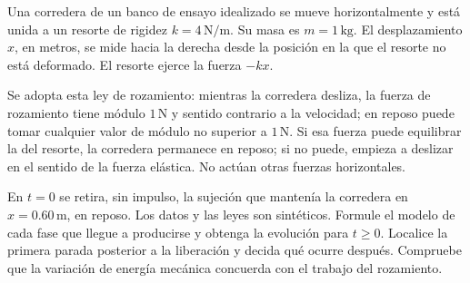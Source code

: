 Una corredera de un banco de ensayo idealizado se mueve horizontalmente y está unida a un resorte de rigidez \(k=4\,\mathrm{N/m}\). Su masa es \(m=1\,\mathrm{kg}\). El desplazamiento \(x\), en metros, se mide hacia la derecha desde la posición en la que el resorte no está deformado. El resorte ejerce la fuerza \(-kx\).

Se adopta esta ley de rozamiento: mientras la corredera desliza, la fuerza de rozamiento tiene módulo \(1\,\mathrm N\) y sentido contrario a la velocidad; en reposo puede tomar cualquier valor de módulo no superior a \(1\,\mathrm N\). Si esa fuerza puede equilibrar la del resorte, la corredera permanece en reposo; si no puede, empieza a deslizar en el sentido de la fuerza elástica. No actúan otras fuerzas horizontales.

En \(t=0\) se retira, sin impulso, la sujeción que mantenía la corredera en \(x=0.60\,\mathrm m\), en reposo. Los datos y las leyes son sintéticos. Formule el modelo de cada fase que llegue a producirse y obtenga la evolución para \(t\ge0\). Localice la primera parada posterior a la liberación y decida qué ocurre después. Compruebe que la variación de energía mecánica concuerda con el trabajo del rozamiento.
